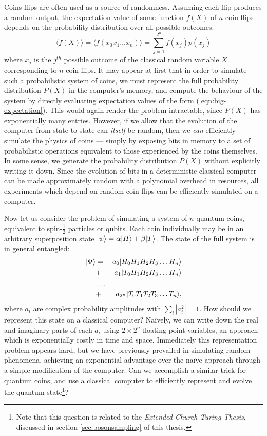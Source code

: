 Coins flips are often used as a source of randomness. Assuming each flip produces a random output, the expectation value of some function $f(X)$ of $n$ coin flips depends on the probability distribution over all possible outcomes:
\begin{equation}
   \langle f(X) \rangle = \langle f(x_0x_1\ldots x_n) \rangle = \sum_{j=1}^{2^n} f(x_j)p(x_j)
   \label{eqn:big-expectation}
\end{equation}
where $x_j$ is the $j^{th}$ possible outcome of the classical random variable $X$ corresponding to $n$ coin flips. It may appear at first that in order to simulate such a probabilistic system of coins, we must represent the full probability distribution $P(X)$ in the computer's memory, and compute the behaviour of the system by directly evaluating expectation values of the form (\ref{eqn:big-expectation}). This would again render the problem intractable, since $P(X)$ has exponentially many entries. However, if we allow that the evolution of the computer from state to state can \emph{itself} be random, then we \emph{can} efficiently simulate the physics of coins --- simply by exposing bits in memory to a set of probabilistic operations equivalent to those experienced by the coins themselves. In some sense, we generate the probability distribution $P(X)$ without explicitly writing it down. Since the evolution of bits in a deterministic classical computer can be made approximately random with a polynomial overhead in resources, all experiments which depend on random coin flips can be efficiently simulated on a computer.

Now let us consider the problem of simulating a system of $n$ quantum coins, equivalent to spin-$\frac{1}{2}$ particles or qubits. Each coin individually may be in an arbitrary superposition state $\mbox{$ | \psi \rangle $} = \alpha \mbox{$ | H \rangle $} + \beta \mbox{$ | T \rangle $}$. The state of the full system is in general entangled:
\begin{eqnarray}
\mbox{$ | \Psi \rangle $} &=& a_0\mbox{$ | H_0H_1H_2H_3\ldots H_n \rangle $}\\
           &+& a_1\mbox{$ | T_0H_1H_2H_3\ldots H_n \rangle $}\\
           &\ldots& \\
           &+& a_{2^n}\mbox{$ | T_0T_1T_2T_3\ldots T_n \rangle $},
    \label{eqn:big-state}
\end{eqnarray}
where $a_i$ are complex probability amplitudes with $\sum_i |a_i^2| = 1$. How should we represent this state on a classical computer? Na\"ively, we can write down the real and imaginary parts of each $a_i$ using $2\times 2^n$ floating-point variables, an approach which is exponentially costly in time and space. Immediately this representation problem appears hard, but we have previously prevailed in simulating random phenomena, achieving an exponential advantage over the na\"ive approach through a simple modification of the computer. Can we accomplish a similar trick for quantum coins, and use a classical computer to efficiently represent and evolve the quantum state\footnote{Note that this question is related to the \emph{Extended Church-Turing Thesis}, discussed in section \ref{sec:bosonsampling} of this thesis.}?

